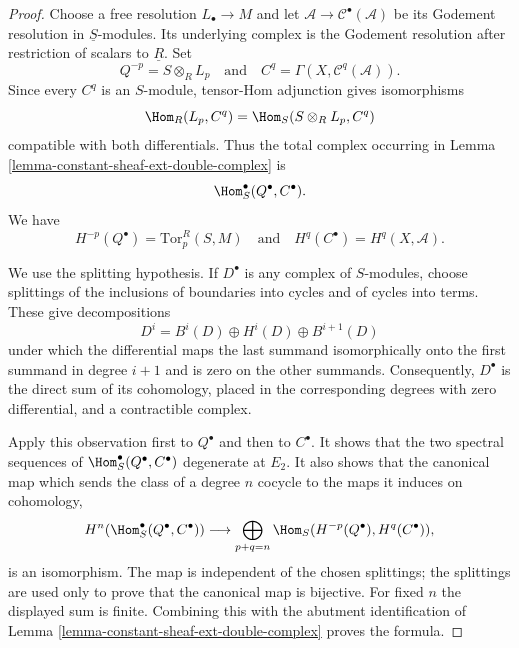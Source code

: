 \begin{proof}
Choose a free resolution $L_\bullet \to M$ and let
$\mathcal{A} \to \mathcal{C}^\bullet(\mathcal{A})$ be its Godement
resolution in $\underline{S}$-modules. Its underlying complex is the
Godement resolution after restriction of scalars to $\underline{R}$.
Set
$$
Q^{-p} = S \otimes_R L_p
\quad\text{and}\quad
C^q = \Gamma(X, \mathcal{C}^q(\mathcal{A})).
$$
Since every $C^q$ is an $S$-module, tensor-Hom adjunction gives
isomorphisms
$$
\Hom_R(L_p, C^q) = \Hom_S(S \otimes_R L_p, C^q)
$$
compatible with both differentials. Thus the total complex occurring
in Lemma \ref{lemma-constant-sheaf-ext-double-complex} is
$$
\Hom_S^\bullet(Q^\bullet, C^\bullet).
$$
We have
$$
H^{-p}(Q^\bullet) = \text{Tor}_p^R(S, M)
\quad\text{and}\quad
H^q(C^\bullet) = H^q(X, \mathcal{A}).
$$

We use the splitting hypothesis. If $D^\bullet$ is any complex of
$S$-modules, choose splittings of the inclusions of boundaries into
cycles and of cycles into terms. These give decompositions
$$
D^i = B^i(D) \oplus H^i(D) \oplus B^{i + 1}(D)
$$
under which the differential maps the last summand isomorphically onto
the first summand in degree $i + 1$ and is zero on the other summands.
Consequently, $D^\bullet$ is the direct sum of its cohomology, placed in
the corresponding degrees with zero differential, and a contractible
complex.

Apply this observation first to $Q^\bullet$ and then to $C^\bullet$.
It shows that the two spectral sequences of
$\Hom_S^\bullet(Q^\bullet, C^\bullet)$ degenerate at $E_2$. It also shows
that the canonical map which sends the class of a degree $n$ cocycle to
the maps it induces on cohomology,
$$
H^n(\Hom_S^\bullet(Q^\bullet, C^\bullet))
\longrightarrow
\bigoplus_{p + q = n}
\Hom_S(H^{-p}(Q^\bullet), H^q(C^\bullet)),
$$
is an isomorphism. The map is independent of the chosen splittings;
the splittings are used only to prove that the canonical map is
bijective. For fixed $n$ the displayed sum is finite. Combining this
with the abutment identification of
Lemma \ref{lemma-constant-sheaf-ext-double-complex} proves the formula.
\end{proof}


